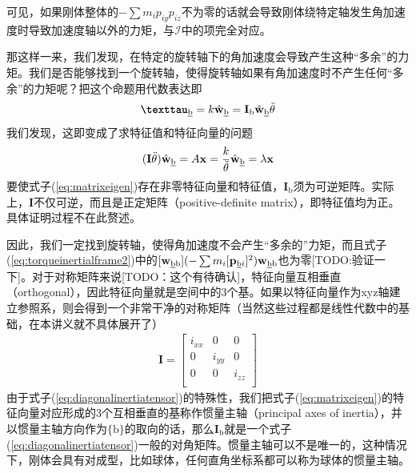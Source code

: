 \documentclass[12pt, a4paper, article, UTF8]{ctexart}
\begin{document}
可见，如果刚体整体的$ -\sum m_i p_{iy} p_{iz}$不为零的话就会导致刚体绕特定轴发生角加速度时导致加速度轴以外的力矩，与$\mathcal{I}$中的项完全对应。

那这样一来，我们发现，在特定的旋转轴下的角加速度会导致产生这种“多余”的力矩。我们是否能够找到一个旋转轴，使得旋转轴如果有角加速度时不产生任何“多余”的力矩呢？把这个命题用代数表达即
\begin{align}
\textbf{\texttau}_{\text{\underline{b}}} = k\hat{\mathbf{w}}_\text{\underline{b}} = \mathbf{I}_\text{b} \hat{\mathbf{w}}_\text{\underline{b}} \ddot{\theta}
\end{align}
我们发现，这即变成了求特征值和特征向量的问题
\begin{align}
(\mathbf{I} \ddot{\theta})\hat{\mathbf{w}}_\text{\underline{b}} = A\mathbf{x} = \frac{k}{\ddot{\theta}} \hat{\mathbf{w}}_\text{\underline{b}} = \lambda \mathbf{x} \label{eq:matrixeigen}
\end{align}
要使式子(\ref{eq:matrixeigen})存在非零特征向量和特征值，$\mathbf{I}_\text{b}$须为可逆矩阵。实际上，$\mathbf{I}$不仅可逆，而且是正定矩阵（positive-definite matrix），即特征值均为正。具体证明过程不在此赘述。


因此，我们一定找到旋转轴，使得角加速度不会产生“多余的”力矩，而且式子(\ref{eq:torqueinertialframe2})中的$[\mathbf{w}_{\text{\underline{b}b}} ](-\sum m_i [\mathbf{p}_{\text{\underline{b}}i}]^2 )\mathbf{w}_{\text{\underline{b}b}}$也为零[TODO:验证一下]。对于对称矩阵来说[TODO：这个有待确认]，特征向量互相垂直（orthogonal），因此特征向量就是空间中的3个基。如果以特征向量作为xyz轴建立参照系，则会得到一个非常干净的对称矩阵（当然这些过程都是线性代数中的基础，在本讲义就不具体展开了）
\begin{align}
\mathbf{I} = \begin{bmatrix}
i_{xx} & 0 &0 \\
0 & i_{yy}&0 \\
0 & 0 &i_{zz} \\
\end{bmatrix} \label{eq:diagonalinertiatensor}
\end{align}
由于式子(\ref{eq:diagonalinertiatensor})的特殊性，我们把式子(\ref{eq:matrixeigen})的特征向量对应形成的3个互相垂直的基称作惯量主轴（principal axes of inertia），并以惯量主轴方向作为$\{\text{b}\}$的取向的话，那么$\mathbf{I}_\text{b}$就是一个式子(\ref{eq:diagonalinertiatensor})一般的对角矩阵。惯量主轴可以不是唯一的，这种情况下，刚体会具有对成型，比如球体，任何直角坐标系都可以称为球体的惯量主轴。
\end{document}
